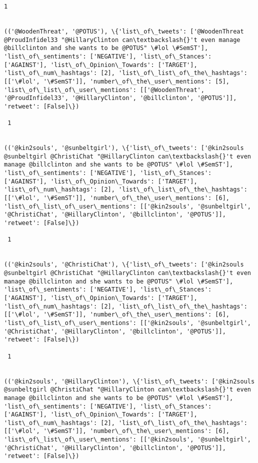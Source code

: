 \documentclass[11pt]{article}
\begin{document}
\begin{Verbatim}[commandchars=\\\{\}]
 1
 

(('@WoodenThreat', '@POTUS'), \{'list\_of\_tweets': ['@WoodenThreat @ProudInfidel33 "@HillaryClinton can\textbackslash{}'t even manage @billclinton and she wants to be @POTUS" \#lol \#SemST'], 'list\_of\_sentiments': ['NEGATIVE'], 'list\_of\_Stances': ['AGAINST'], 'list\_of\_Opinion\_Towards': ['TARGET'], 'list\_of\_num\_hashtags': [2], 'list\_of\_list\_of\_the\_hashtags': [['\#lol', '\#SemST']], 'number\_of\_the\_user\_mentions': [5], 'list\_of\_list\_of\_user\_mentions': [['@WoodenThreat', '@ProudInfidel33', '@HillaryClinton', '@billclinton', '@POTUS']], 'retweet': [False]\})

 1
 

(('@kin2souls', '@sunbeltgirl'), \{'list\_of\_tweets': ['@kin2souls @sunbeltgirl @ChristiChat "@HillaryClinton can\textbackslash{}'t even manage @billclinton and she wants to be @POTUS" \#lol \#SemST'], 'list\_of\_sentiments': ['NEGATIVE'], 'list\_of\_Stances': ['AGAINST'], 'list\_of\_Opinion\_Towards': ['TARGET'], 'list\_of\_num\_hashtags': [2], 'list\_of\_list\_of\_the\_hashtags': [['\#lol', '\#SemST']], 'number\_of\_the\_user\_mentions': [6], 'list\_of\_list\_of\_user\_mentions': [['@kin2souls', '@sunbeltgirl', '@ChristiChat', '@HillaryClinton', '@billclinton', '@POTUS']], 'retweet': [False]\})

 1
 

(('@kin2souls', '@ChristiChat'), \{'list\_of\_tweets': ['@kin2souls @sunbeltgirl @ChristiChat "@HillaryClinton can\textbackslash{}'t even manage @billclinton and she wants to be @POTUS" \#lol \#SemST'], 'list\_of\_sentiments': ['NEGATIVE'], 'list\_of\_Stances': ['AGAINST'], 'list\_of\_Opinion\_Towards': ['TARGET'], 'list\_of\_num\_hashtags': [2], 'list\_of\_list\_of\_the\_hashtags': [['\#lol', '\#SemST']], 'number\_of\_the\_user\_mentions': [6], 'list\_of\_list\_of\_user\_mentions': [['@kin2souls', '@sunbeltgirl', '@ChristiChat', '@HillaryClinton', '@billclinton', '@POTUS']], 'retweet': [False]\})

 1
 

(('@kin2souls', '@HillaryClinton'), \{'list\_of\_tweets': ['@kin2souls @sunbeltgirl @ChristiChat "@HillaryClinton can\textbackslash{}'t even manage @billclinton and she wants to be @POTUS" \#lol \#SemST'], 'list\_of\_sentiments': ['NEGATIVE'], 'list\_of\_Stances': ['AGAINST'], 'list\_of\_Opinion\_Towards': ['TARGET'], 'list\_of\_num\_hashtags': [2], 'list\_of\_list\_of\_the\_hashtags': [['\#lol', '\#SemST']], 'number\_of\_the\_user\_mentions': [6], 'list\_of\_list\_of\_user\_mentions': [['@kin2souls', '@sunbeltgirl', '@ChristiChat', '@HillaryClinton', '@billclinton', '@POTUS']], 'retweet': [False]\})


\end{Verbatim}
\end{document}
